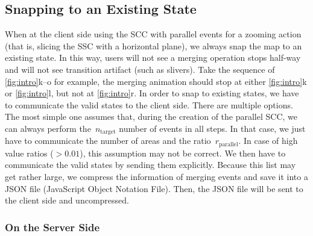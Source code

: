 \documentclass[ijgi,article,submit,moreauthors,pdftex]{Definitions/mdpi}
\begin{document}
%









\subsection{Snapping to an Existing State}
\label{sec:snap}

When at the client side 
using the SCC with parallel events for a zooming action
(that is, slicing the SSC with a horizontal plane), 
we always snap the map to an existing state.
In this way, users will not see a merging operation stops half-way
and will not see transition artifact (such as slivers).
Take the sequence of \fig\ref{fig:intro}k--o for example, 
the merging animation should stop at 
either \ref{fig:intro}k or \ref{fig:intro}l,
but not at \ref{fig:intro}r.
In order to snap to existing states,
we have to communicate the valid states to the client side. 
There are multiple options. 
The most simple one assumes that, 
during the creation of the parallel SCC, 
we can always perform the~$n_\mathrm{target}$ number of events in all steps. 
In that case, we just have to communicate 
the number of areas and the ratio~$r_\mathrm{parallel}$. 
In case of high value ratios ($> 0.01$), 
this assumption may not be correct. 
We then have to communicate the valid states by sending them explicitly. 
Because this list may get rather large,
we compress the information of merging events and save it into 
a JSON file (JavaScript Object Notation File).
Then, the JSON file will be sent to the client side and uncompressed.


\subsubsection{On the Server Side}
\label{sec:snap_server}
\end{document}
